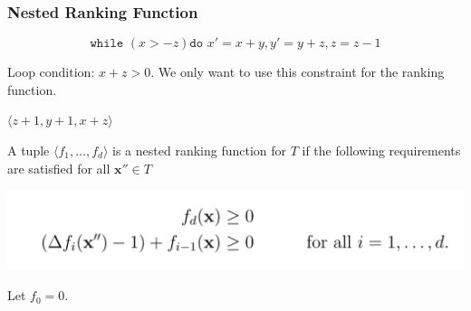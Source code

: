\documentclass[11pt]{beamer}
\begin{document}
\begin{frame}\frametitle{Nested Ranking Function}
\[\texttt{while }( x > -z) \texttt{do } x' = x + y, y' = y + z, z = z - 1\]

Loop condition: $x + z > 0$. We only want to use this constraint for the ranking function.

$\langle z + 1, y + 1, x + z\rangle$


\begin{definition}

A tuple $\langle f_1, \ldots, f_d\rangle$ is a nested ranking function for $T$ if the following requirements are satisfied for all $\textbf{x}''\in T$
\begin{center}
\includegraphics[scale = 0.3]{6.png}

\end{center}

\end{definition}

Let $f_0 = 0$.
\end{frame}

\begin{frame}\frametitle{}



\end{frame}
\end{document}
